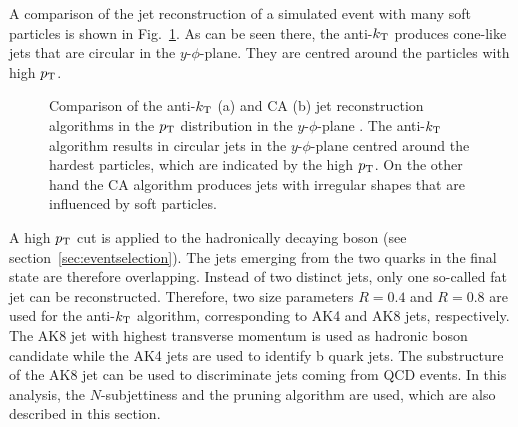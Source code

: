 \noindent A comparison of the jet reconstruction of a simulated event with many soft particles is shown in Fig.~\ref{fig:eventreco:jet_reco}. As can be seen there, the anti-$k_{\rm T}$ produces cone-like jets that are circular in the $y$-$\phi$-plane. They are centred around the particles with high $p_{\rm T}$.\\
\begin{figure}
	\centering
	\caption[Comparison of the anti-$k_{\rm T}$ and CA jet reconstruction algorithms]{Comparison of the anti-$k_{\rm T}$ (a) and CA (b) jet reconstruction algorithms in the $p_{\rm T}$ distribution in the $y$-$\phi$-plane \cite{antikt}. The anti-$k_{\rm T}$ algorithm results in circular jets in the $y$-$\phi$-plane centred around the hardest particles, which are indicated by the high $p_{\rm T}$. On the other hand the CA algorithm produces jets with irregular shapes that are influenced by soft particles.}
	\label{fig:eventreco:jet_reco}
\end{figure}

\noindent A high $p_{\rm T}$ cut is applied to the hadronically decaying boson (see section~\ref{sec:eventselection}). The jets emerging from the two quarks in the final state are therefore overlapping. Instead of two distinct jets, only one so-called fat jet can be reconstructed. Therefore, two size parameters $R=0.4$ and $R=0.8$ are used for the anti-$k_{\rm T}$ algorithm, corresponding to AK4 and AK8 jets, respectively. The AK8 jet with highest transverse momentum is used as hadronic boson candidate while the AK4 jets are used to identify b quark jets. The substructure of the AK8 jet can be used to discriminate jets coming from QCD events. In this analysis, the $N$-subjettiness and the pruning algorithm are used, which are also described in this section.

